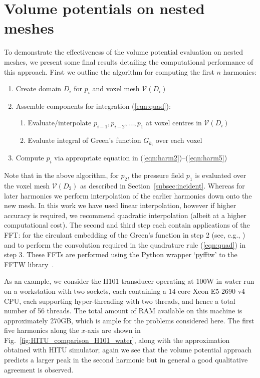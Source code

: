 \documentclass[preprint]{JASA}
\begin{document}
\section{Volume potentials on nested meshes}
\label{subsec:interpolation}
To demonstrate the effectiveness of the volume potential evaluation on nested meshes, 
we present some final results detailing the computational performance of this 
approach. First we outline the algorithm for computing the first $n$ harmonics:
\begin{algorithmic}
    \begin{enumerate}
        \item Create domain $D_i$ for $p_i$ and voxel mesh $\mathcal{V}(D_i)$
        \item Assemble components for integration (\ref{eqn:quad}):
            \begin{enumerate}
                \item Evaluate/interpolate $p_{i-1},p_{i-2},\ldots,p_1$ at voxel centres in $\mathcal{V}(D_i)$
                \item Evaluate integral of Green's function $G_{k_i}$ over each voxel
            \end{enumerate}
        \item Compute $p_i$ via appropriate equation in (\ref{eqn:harm2})--(\ref{eqn:harm5})
    \end{enumerate}
    \EndFor
\end{algorithmic}
Note that in the above algorithm, for $p_2$, the pressure field $p_1$ is evaluated
over the voxel mesh $\mathcal{V}(D_2)$ as described in Section~\ref{subsec:incident}. 
Whereas for later harmonics we perform interpolation of the earlier harmonics down
onto the new mesh. In this work we have used linear interpolation, however if 
higher accuracy is required, we recommend quadratic interpolation (albeit at a 
higher computational cost). The second and third step each contain applications of the 
FFT: for the circulant embedding of the Green's function in step 2
(see, e.g., \cite{groth2020accelerating}) and to perform the convolution 
required in the quadrature rule (\ref{eqn:quad}) in step 3.
These FFTs are performed using the Python wrapper `pyfftw' to the FFTW 
library~\cite{FFTW05}. 

As an example, we consider the H101 transducer operating at 100W in water
run on a workstation with two sockets, each containing a 14-core Xeon E5-2690 
v4 CPU, each supporting hyper-threading with two threads, and hence a total 
number of 56 threads. The total amount of RAM available on this machine is 
approximately 270GB, which is ample for the problems considered here.
The first five harmonics along the $x$-axis are shown in 
Fig.~\ref{fig:HITU_comparison_H101_water}, along with the approximation obtained 
with HITU simulator; again we see that the volume potential approach predicts a 
larger peak in the second harmonic but in general a good qualitative agreement
is observed.
\end{document}
